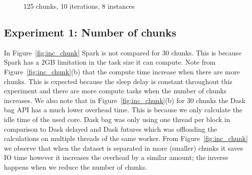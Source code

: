 \documentclass[conference]{IEEEtran}
\begin{document}
\begin{figure}[!t]
    \centering
    
    \caption{125 chunks, 10 iterations, 8 instances}
    \label{fig:inc_sleep}
\end{figure}


\subsection{Experiment 1: Number of chunks}
In Figure~\ref{fig:inc_chunk} Spark is not compared for 30 chunks. This is because
Spark has a 2GB limitation in the task size it can compute. Note from
Figure~\ref{fig:inc_chunk}(b) that the compute time increase when there are more
chunks. This is expected because the sleep delay is constant throughout this
experiment and there are more compute tasks when the number of chunks increases. We
also note that in Figure~\ref{fig:inc_chunk}(b) for 30 chunks the Dask bag API has a
much lower overhead time. This is because we only calculate the idle time of the used
core. Dask bag was only using one thread per block in comparison to Dask delayed and
Dask futures which was offloading the calculations on multiple threads of the same
worker. From Figure~\ref{fig:inc_chunk} we observe that when the dataset is separated
in more (smaller) chunks it saves IO time however it increases the overhead by a
similar amount; the inverse happens when we reduce the number of chunks.
\end{document}
